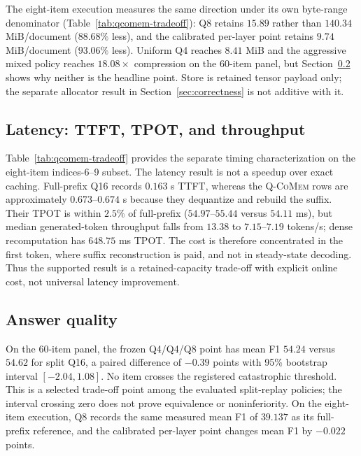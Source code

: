 \documentclass{article}
\newcommand{\qcomem}{\textsc{Q-CoMem}}
\begin{document}
The eight-item execution measures the same direction under its own byte-range
denominator (Table~\ref{tab:qcomem-tradeoff}): Q8 retains $15.89$ rather than
$140.34$ MiB/document ($88.68\%$ less), and the calibrated per-layer point
retains $9.74$ MiB/document ($93.06\%$ less).  Uniform Q4 reaches $8.41$ MiB and
the aggressive mixed policy reaches $18.08\times$ compression on the 60-item
panel, but Section~\ref{sec:quality} shows why neither is the headline point.
Store is retained tensor payload only; the separate allocator result in
Section~\ref{sec:correctness} is not additive with it.



\subsection{Latency: TTFT, TPOT, and throughput}
\label{sec:latency}

Table~\ref{tab:qcomem-tradeoff} provides the separate timing characterization
on the eight-item indices-6--9 subset.  The latency result is not a speedup over
exact caching.  Full-prefix Q16 records $0.163$ s TTFT, whereas the \qcomem{}
rows are approximately $0.673$--$0.674$ s because they dequantize and rebuild
the suffix.  Their TPOT is within $2.5\%$ of full-prefix ($54.97$--$55.44$
versus $54.11$ ms), but median generated-token throughput falls from $13.38$ to
$7.15$--$7.19$ tokens/s; dense recomputation has $648.75$ ms TPOT.  The cost is
therefore concentrated in the first token, where suffix reconstruction is paid,
and not in steady-state decoding.  Thus the supported result is a retained-capacity
trade-off with explicit online cost, not universal latency improvement.



\subsection{Answer quality}
\label{sec:quality}

On the 60-item panel, the frozen Q4/Q4/Q8 point has mean F1 $54.24$ versus
$54.62$ for split Q16, a paired difference of $-0.39$ points with 95\%
bootstrap interval $[-2.04,1.08]$.  No item crosses the registered
catastrophic threshold.  This is a selected trade-off point among the evaluated
split-replay policies; the interval crossing zero does not prove equivalence or
noninferiority.  On the eight-item execution, Q8 records the same measured mean
F1 of $39.137$ as its full-prefix reference, and the calibrated per-layer point
changes mean F1 by $-0.022$ points.
\end{document}
